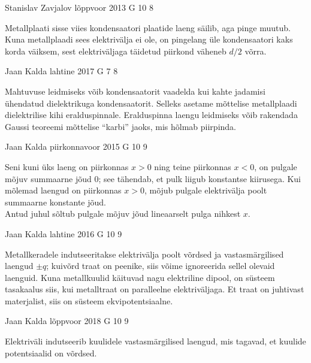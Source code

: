 \documentclass[11pt, twoside]{article}
\begin{document}
{%
{Stanislav Zavjalov} %
{lõppvoor} %
{2013} %
{G 10} %
{8} %
{

\ifHint
Metallplaati sisse viies kondensaatori plaatide laeng säilib, aga pinge muutub. Kuna metallplaadi sees elektrivälja ei ole, on pingelang üle kondensaatori kaks korda väiksem, sest elektriväljaga täidetud piirkond väheneb $d/2$ võrra.
\fi
}

{Jaan Kalda} %
{lahtine} %
{2017} %
{G 7} %
{8} %
{

\ifHint
Mahtuvuse leidmiseks võib kondensaatorit vaadelda kui kahte jadamisi ühendatud dielektrikuga kondensaatorit. Selleks asetame mõttelise metallplaadi dielektrilise kihi eralduspinnale. Eralduspinna laengu leidmiseks võib rakendada Gaussi teoreemi mõttelise \enquote{karbi} jaoks, mis hõlmab piirpinda.
\fi
}

{Jaan Kalda} %
{piirkonnavoor} %
{2015} %
{G 10} %
{9} %
{

\ifHint
\osa Seni kuni üks laeng on piirkonnas $x>0$ ning teine piirkonnas $x<0$, on pulgale mõjuv summaarne jõud \num{0}; see tähendab, et pulk liigub konstantse kiirusega. Kui mõlemad laengud on piirkonnas $x>0$, mõjub pulgale elektrivälja poolt summaarne konstante jõud.\\
\osa Antud juhul sõltub pulgale mõjuv jõud lineaarselt pulga nihkest $x$.
\fi
}

{Jaan Kalda} %
{lahtine} %
{2016} %
{G 10} %
{9} %
{

\ifHint
Metallkeradele indutseeritakse elektrivälja poolt võrdsed ja vastasmärgilised laengud $\pm q$; kuivõrd traat on peenike,
siis võime ignoreerida sellel olevaid laenguid. Kuna metallkuulid käituvad nagu elektriline dipool, on süsteem tasakaalus siis, kui metalltraat on paralleelne elektriväljaga. Et traat on juhtivast materjalist, siis on süsteem ekvipotentsiaalne.
\fi
}

{Jaan Kalda} %
{lõppvoor} %
{2018} %
{G 10} %
{9} %
{

\ifHint
Elektriväli indutseerib kuulidele vastasmärgilised laengud, mis tagavad, et kuulide potentsiaalid on võrdsed.
\fi
}

}
\end{document}
